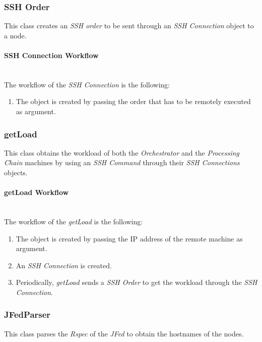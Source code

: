 \subsubsection{SSH Order}

This class creates an \emph{SSH order} to be sent through an \emph{SSH Connection} object to a \vw node.

\paragraph{SSH Connection Workflow}~\\

The workflow of the \emph{SSH Connection} is the following:
\begin{enumerate}
\item The object is created by passing the order that has to be remotely executed as argument.
\end{enumerate}

\subsubsection{getLoad}

This class obtains the  workload of  both the \emph{Orchestrator} and  the \emph{Processing Chain} machines by using an \emph{SSH Command} through their \emph{SSH Connections} objects.

\paragraph{getLoad Workflow}~\\

The workflow of the \emph{getLoad} is the following:
\begin{enumerate}
\item The object is created by passing the \ac{IP} address of the remote machine as argument.
\item An \emph{SSH Connection} is created.
\item Periodically, \emph{getLoad} sends a \emph{SSH Order} to get the workload through the \emph{SSH Connection}.
\end{enumerate}

\subsubsection{JFedParser}

This class parses the  \emph{Rspec} of the \emph{JFed} to obtain the hostnames of the \vw nodes.

